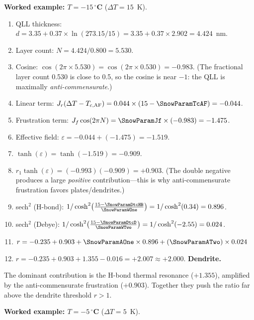 \documentclass[12pt,letterpaper]{article}
\begin{document}
\textbf{Worked example: $T = -15\,{}^\circ$C} ($\Delta T = 15$~K).

\begin{enumerate}
\item QLL thickness: $d = 3.35 + 0.37 \times \ln(273.15/15) = 3.35 + 0.37 \times 2.902 = 4.424$~nm.
\item Layer count: $N = 4.424 / 0.800 = 5.530$.
\item Cosine: $\cos(2\pi \times 5.530) = \cos(2\pi \times 0.530) = -0.983$.  (The fractional layer count 0.530 is close to 0.5, so the cosine is near $-1$: the QLL is maximally \emph{anti-commensurate}.)
\item Linear term: $J_r(\Delta T - T_{c,\mathrm{AF}}) = 0.044 \times (15 - \SnowParamTcAF) = -0.044$.
\item Frustration term: $J_f \cos(2\pi N) = \SnowParamJf \times (-0.983) = -1.475$.
\item Effective field: $\varepsilon = -0.044 + (-1.475) = -1.519$.
\item $\tanh(\varepsilon) = \tanh(-1.519) = -0.909$.
\item $r_1 \tanh(\varepsilon) = (-0.993)(-0.909) = +0.903$. (The double negative produces a large \emph{positive} contribution---this is why anti-commensurate frustration favors plates/dendrites.)
\item sech$^2$ (H-bond): $1/\cosh^2\!\left(\frac{15 - \SnowParamDtcHB}{\SnowParamWOne}\right) = 1/\cosh^2(0.34) = 0.896$.
\item sech$^2$ (Debye): $1/\cosh^2\!\left(\frac{15 - \SnowParamDtcD}{\SnowParamWTwo}\right) = 1/\cosh^2(-2.55) = 0.024$.
\item $r = -0.235 + 0.903 + \SnowParamAOne \times 0.896 + (\SnowParamATwo) \times 0.024$
\item $r = -0.235 + 0.903 + 1.355 - 0.016 = +2.007 \approx +2.000$.  \textbf{Dendrite.} \checkmark
\end{enumerate}

The dominant contribution is the H-bond thermal resonance ($+1.355$), amplified by the anti-commensurate frustration ($+0.903$). Together they push the ratio far above the dendrite threshold $r > 1$.

\medskip
\textbf{Worked example: $T = -5\,{}^\circ$C} ($\Delta T = 5$~K).
\end{document}
